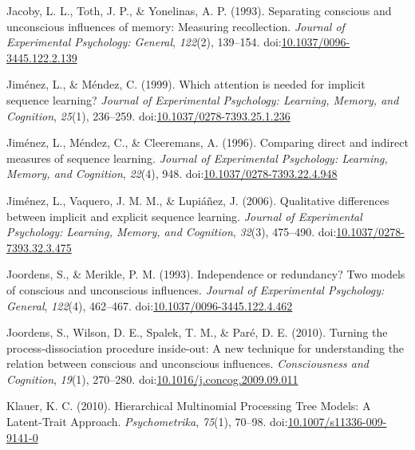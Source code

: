 \documentclass[floatsintext,doc]{apa6}
\theoremstyle{definition}
\theoremstyle{definition}
\theoremstyle{definition}
\theoremstyle{remark}
\begin{document}
\hypertarget{ref-jacoby_separating_1993}{}
Jacoby, L. L., Toth, J. P., \& Yonelinas, A. P. (1993). Separating
conscious and unconscious influences of memory: Measuring recollection.
\emph{Journal of Experimental Psychology: General}, \emph{122}(2),
139--154.
doi:\href{https://doi.org/10.1037/0096-3445.122.2.139}{10.1037/0096-3445.122.2.139}

\hypertarget{ref-jimenez_which_1999}{}
Jiménez, L., \& Méndez, C. (1999). Which attention is needed for
implicit sequence learning? \emph{Journal of Experimental Psychology:
Learning, Memory, and Cognition}, \emph{25}(1), 236--259.
doi:\href{https://doi.org/10.1037/0278-7393.25.1.236}{10.1037/0278-7393.25.1.236}

\hypertarget{ref-jimenez_comparing_1996}{}
Jiménez, L., Méndez, C., \& Cleeremans, A. (1996). Comparing direct and
indirect measures of sequence learning. \emph{Journal of Experimental
Psychology: Learning, Memory, and Cognition}, \emph{22}(4), 948.
doi:\href{https://doi.org/10.1037/0278-7393.22.4.948}{10.1037/0278-7393.22.4.948}

\hypertarget{ref-jimenez_qualitative_2006}{}
Jiménez, L., Vaquero, J. M. M., \& Lupiáñez, J. (2006). Qualitative
differences between implicit and explicit sequence learning.
\emph{Journal of Experimental Psychology: Learning, Memory, and
Cognition}, \emph{32}(3), 475--490.
doi:\href{https://doi.org/10.1037/0278-7393.32.3.475}{10.1037/0278-7393.32.3.475}

\hypertarget{ref-joordens_independence_1993}{}
Joordens, S., \& Merikle, P. M. (1993). Independence or redundancy? Two
models of conscious and unconscious influences. \emph{Journal of
Experimental Psychology: General}, \emph{122}(4), 462--467.
doi:\href{https://doi.org/10.1037/0096-3445.122.4.462}{10.1037/0096-3445.122.4.462}

\hypertarget{ref-joordens_turning_2010}{}
Joordens, S., Wilson, D. E., Spalek, T. M., \& Paré, D. E. (2010).
Turning the process-dissociation procedure inside-out: A new technique
for understanding the relation between conscious and unconscious
influences. \emph{Consciousness and Cognition}, \emph{19}(1), 270--280.
doi:\href{https://doi.org/10.1016/j.concog.2009.09.011}{10.1016/j.concog.2009.09.011}

\hypertarget{ref-klauer_hierarchical_2010}{}
Klauer, K. C. (2010). Hierarchical Multinomial Processing Tree Models: A
Latent-Trait Approach. \emph{Psychometrika}, \emph{75}(1), 70--98.
doi:\href{https://doi.org/10.1007/s11336-009-9141-0}{10.1007/s11336-009-9141-0}
\end{document}
